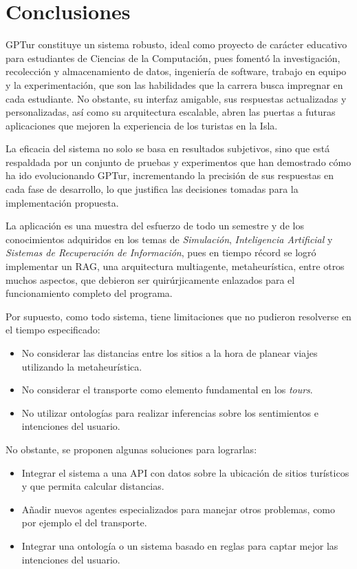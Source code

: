 \documentclass[10pt]{llncs}
\begin{document}

\vspace{\baselineskip}
\section{Conclusiones}


GPTur constituye un sistema robusto, ideal como proyecto de carácter educativo para estudiantes de Ciencias de la Computación, pues fomentó 
la investigación, recolección y almacenamiento de datos, ingeniería de software, trabajo en equipo y la experimentación, que son las habilidades que la carrera busca impregnar en cada 
estudiante. No obstante, su interfaz amigable, sus respuestas actualizadas y personalizadas, así como su arquitectura escalable, abren las puertas a futuras aplicaciones que mejoren la experiencia de los turistas en la Isla.

La eficacia del sistema no solo se basa en resultados subjetivos, sino que está respaldada por un conjunto de pruebas y experimentos que han demostrado cómo ha ido evolucionando GPTur, incrementando la precisión de sus respuestas en cada fase 
de desarrollo, lo que justifica las decisiones tomadas para la implementación propuesta.

La aplicación es una muestra del esfuerzo de todo un semestre y de los conocimientos adquiridos en los temas de \textit{Simulación}, \textit{Inteligencia Artificial} y \textit{Sistemas de Recuperación de Información}, pues en tiempo récord se logró 
implementar un RAG, una arquitectura multiagente, metaheurística, entre otros muchos aspectos, que debieron ser quirúrjicamente enlazados para el funcionamiento completo del programa.

Por supuesto, como todo sistema, tiene limitaciones que no pudieron resolverse en el tiempo especificado:
\begin{itemize}
    \item No considerar las distancias entre los sitios a la hora de planear viajes utilizando la metaheurística.
    \item No considerar el transporte como elemento fundamental en los \textit{tours}.
    \item No utilizar ontologías para realizar inferencias sobre los sentimientos e intenciones del usuario.
\end{itemize}

No obstante, se proponen algunas soluciones para lograrlas:
\begin{itemize}
    \item Integrar el sistema a una API con datos sobre la ubicación de sitios turísticos y que permita calcular distancias.
    \item Añadir nuevos agentes especializados para manejar otros problemas, como por ejemplo el del transporte.
    \item Integrar una ontología o un sistema basado en reglas para captar mejor las intenciones del usuario.
\end{itemize}
\end{document}
